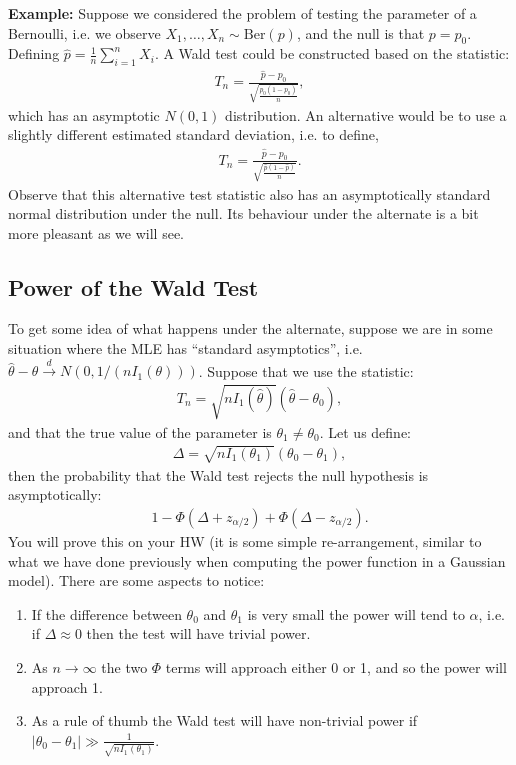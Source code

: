 \documentclass[twoside,12pt]{article}
\newcommand{\cdist}{\overset{d}{\rightarrow}}
\begin{document}
{\bf Example: } Suppose we considered the problem of testing the parameter of a Bernoulli, i.e. we observe $X_1,\ldots,X_n \sim \text{Ber}(p)$, and the null is that $p = p_0$.
Defining $\widehat{p} = \frac{1}{n} \sum_{i=1}^n X_i.$
A Wald test could be constructed based on the statistic:
\begin{align*}
T_n = \frac{ \widehat{p} - p_0} { \sqrt{\frac{p_0(1-p_0)}{n}}},
\end{align*}
which has an asymptotic $N(0,1)$ distribution. An alternative would be to use a slightly different estimated standard deviation, i.e. to define,
\begin{align*}
T_n = \frac{\widehat{p} - p_0} { \sqrt{\frac{\widehat{p}(1-\widehat{p})}{n}}}.
\end{align*}
Observe that this alternative test statistic also has an asymptotically standard normal distribution under the null. Its behaviour under the alternate is a bit more pleasant as we will see.

\subsection{Power of the Wald Test}
To get some idea of what happens under the alternate, suppose we are in some situation where the MLE has ``standard asymptotics'', i.e. $\widehat{\theta} - \theta \cdist N(0,1/(nI_1(\theta)))$.
Suppose that we use the statistic: 
\begin{align*}
T_n = \sqrt{n I_1(\widehat{\theta})} (\widehat{\theta} - \theta_0),
\end{align*}
and that the true value of the parameter is $\theta_1 \neq \theta_0$. Let us define:
\begin{align*}
\Delta = \sqrt{n I_1(\theta_1)} (\theta_0 - \theta_1),
\end{align*}
then the probability that the Wald test rejects the null hypothesis is asymptotically:
\begin{align*}
1 - \Phi\left( \Delta + z_{\alpha/2} \right) + \Phi\left(\Delta - z_{\alpha/2}  \right).
\end{align*}
You will prove this on your HW (it is some simple re-arrangement, similar to what we have done previously when computing the power function in a Gaussian model).
There are some aspects to notice:
\begin{enumerate}
\item If the difference between $\theta_0$ and $\theta_1$ is very small the power will tend to $\alpha$, i.e. if $\Delta \approx 0$ then the test will have trivial power. 
\item As $n \rightarrow \infty$ the two $\Phi$ terms will approach either 0 or 1, and so the power will approach 1.
\item As a rule of thumb the Wald test will have non-trivial power if $|\theta_0 - \theta_1| \gg \frac{1}{\sqrt{n I_1(\theta_1)}}$.
\end{enumerate}
\end{document}
